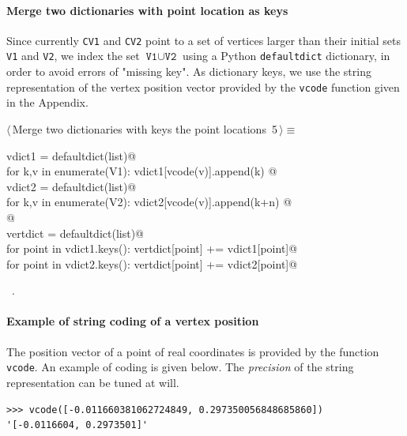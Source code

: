 \documentclass[11pt,oneside]{article}	%
\begin{document}
\paragraph{Merge two dictionaries with point location as keys}
Since currently \texttt{CV1} and \texttt{CV2} point to a set of vertices larger than their initial sets 
\texttt{V1} and \texttt{V2}, we index the set $\texttt{V1} \cup \texttt{V2}$ using a Python \texttt{defaultdict} dictionary, in order to avoid errors of "missing key". As dictionary keys, we use the string representation of the vertex position vector provided by the \texttt{vcode} function given in the Appendix.
\begin{flushleft} \small \label{scrap5}
\protect{}$\langle\,$Merge two dictionaries with keys the point locations\nobreak\ {\footnotesize 5}$\,\rangle\equiv$
\vspace{-1ex}
\begin{list}{}{} \item
\mbox{}\verb@   vdict1 = defaultdict(list)@\\
\mbox{}\verb@   for k,v in enumerate(V1): vdict1[vcode(v)].append(k) @\\
\mbox{}\verb@   vdict2 = defaultdict(list)@\\
\mbox{}\verb@   for k,v in enumerate(V2): vdict2[vcode(v)].append(k+n) @\\
\mbox{}\verb@   @\\
\mbox{}\verb@   vertdict = defaultdict(list)@\\
\mbox{}\verb@   for point in vdict1.keys(): vertdict[point] += vdict1[point]@\\
\mbox{}\verb@   for point in vdict2.keys(): vertdict[point] += vdict2[point]@\\
\mbox{}\verb@@{\NWsep}
\end{list}
\vspace{-1ex}
\footnotesize\addtolength{\baselineskip}{-1ex}
\begin{list}{}{\setlength{\itemsep}{-\parsep}\setlength{\itemindent}{-\leftmargin}}
\item \NWtxtMacroRefIn\ .
\end{list}
\end{flushleft}

\paragraph{Example of string coding of a vertex position}
The position vector of a point of real coordinates is provided by the function \texttt{vcode}.
An example of coding is given below. The \emph{precision} of the string representation can be tuned at will.
{\small
\begin{verbatim}
>>> vcode([-0.011660381062724849, 0.297350056848685860])
'[-0.0116604, 0.2973501]'
\end{verbatim}}
\end{document}
